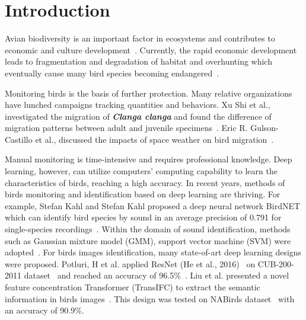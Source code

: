 \section{Introduction}
\newcommand{\textbi}[1]{\textit{\textbf{#1}}}
Avian biodiversity is an important factor 
in ecosystems and contributes to 
economic and culture development~\cite{bc1}. 
Currently, the rapid economic development leads to fragmentation and degradation of habitat and overhunting 
which eventually cause many bird species becoming endangered~\cite{bc1,bc2}. 

Monitoring birds is the basis of further protection.
Many relative organizations have lunched campaigns 
tracking quantities and behaviors. 
Xu Shi et al., investigated the migration of
\textbi{Clanga clanga} and found the difference of 
migration patterns between adult and juvenile specimens~\cite{bc3}.
Eric R. Gulson-Castillo et al., discussed the impacts 
of space weather on bird migration~\cite{bc4}.

Manual monitoring is time-intensive and requires professional knowledge.
Deep learning, however, can utilize computers' computing capability to learn the characteristics of birds, 
reaching a high accuracy.
In recent years, methods of birds monitoring and identification based on deep learning are 
thriving. For example, Stefan Kahl and Stefan Kahl  
proposed a deep neural network BirdNET which can 
identify bird species by sound in an average precision of 
0.791 for single-species recordings~\cite{sa1}.
Within the domain of sound identification, methods
such as Gaussian mixture model (GMM),  support vector machine (SVM)
were adopted~\cite{sa2,sa3}. For birds images identification, many state-of-art deep learning designs
were proposed. Potluri, H et al. applied ResNet (He et al., 2016)~\cite{resnet} on 
CUB-200-2011 dataset~\cite{dataset1} and reached an accuracy of 96.5\%~\cite{sa4}.
Liu et al. presented a novel feature concentration Transformer 
(TransIFC) to extract the semantic information in birds images~\cite{sa5}. 
This design was tested on NABirds dataset~\cite{dataset2} with an accuracy of 90.9\%.

